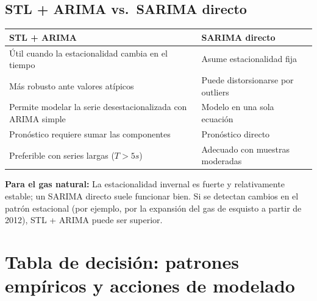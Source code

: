 \documentclass[12pt,a4paper]{article}
\theoremstyle{definition}
\begin{document}
\subsection{STL + ARIMA vs.\ SARIMA directo}

\begin{center}
\renewcommand{\arraystretch}{1.3}
\begin{tabular}{p{5cm}p{5cm}}
\toprule
\textbf{STL + ARIMA} & \textbf{SARIMA directo} \\
\midrule
Útil cuando la estacionalidad cambia en el tiempo & Asume estacionalidad fija \\
Más robusto ante valores atípicos & Puede distorsionarse por outliers \\
Permite modelar la serie desestacionalizada con ARIMA simple & Modelo en una sola ecuación \\
Pronóstico requiere sumar las componentes & Pronóstico directo \\
Preferible con series largas ($T > 5s$) & Adecuado con muestras moderadas \\
\bottomrule
\end{tabular}
\end{center}

\noindent\textbf{Para el gas natural:} La estacionalidad invernal es fuerte y
relativamente estable; un SARIMA directo suele funcionar bien. Si se detectan
cambios en el patrón estacional (por ejemplo, por la expansión del gas de esquisto
a partir de 2012), STL + ARIMA puede ser superior.

\section{Tabla de decisión: patrones empíricos y acciones de modelado}
\end{document}
